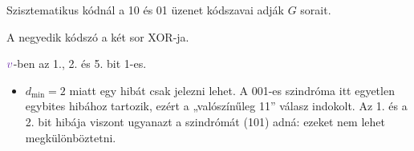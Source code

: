 Szisztematikus kódnál a 10 és 01 üzenet kódszavai adják $G$ sorait.

\begin{center}\end{center}

A negyedik kódszó a két sor XOR-ja.

\begin{center}\end{center}

\begin{center}\end{center}

${\cc{v}}$-ben az 1., 2. és 5. bit 1-es.

\begin{center}\end{center}

\begin{center}\end{center}
\begin{eredmeny}

\begin{center}\end{center}
\end{eredmeny}
\begin{tipp}[Ellenőrzés]
\begin{itemize}
\item $d_{\min}=2$ miatt egy hibát csak jelezni lehet. A 001-es szindróma itt egyetlen egybites hibához tartozik, ezért a „valószínűleg 11” válasz indokolt. Az 1. és a 2. bit hibája viszont ugyanazt a szindrómát (101) adná: ezeket nem lehet megkülönböztetni.
\end{itemize}
\end{tipp}



